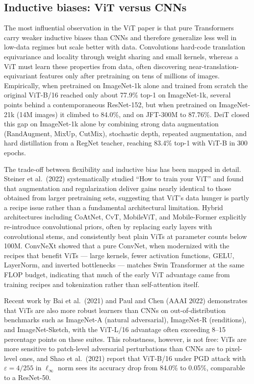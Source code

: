 \documentclass{article}
\begin{document}
\subsection{Inductive biases: ViT versus CNNs}\label{inductive-biases-vit-versus-cnns}

The most influential observation in the ViT paper is that pure Transformers carry weaker inductive biases than CNNs and therefore generalize less well in low-data regimes but scale better with data. Convolutions hard-code translation equivariance and locality through weight sharing and small kernels, whereas a ViT must learn these properties from data, often discovering near-translation-equivariant features only after pretraining on tens of millions of images. Empirically, when pretrained on ImageNet-1k alone and trained from scratch the original ViT-B/16 reached only about 77.9\% top-1 on ImageNet-1k, several points behind a contemporaneous ResNet-152, but when pretrained on ImageNet-21k (14M images) it climbed to 84.0\%, and on JFT-300M to 87.76\%. DeiT \citep{touvron2022resmlpfeedforwardn} closed this gap on ImageNet-1k alone by combining strong data augmentation (RandAugment, MixUp, CutMix), stochastic depth, repeated augmentation, and hard distillation from a RegNet teacher, reaching 83.4\% top-1 with ViT-B in 300 epochs.

The trade-off between flexibility and inductive bias has been mapped in detail. Steiner et al.~(2022) systematically studied ``How to train your ViT'' and found that augmentation and regularization deliver gains nearly identical to those obtained from larger pretraining sets, suggesting that ViT's data hunger is partly a recipe issue rather than a fundamental architectural limitation. Hybrid architectures including CoAtNet, CvT, MobileViT, and Mobile-Former \citep{chen2022mobileformerbridgi} explicitly re-introduce convolutional priors, often by replacing early layers with convolutional stems, and consistently beat plain ViTs at parameter counts below 100M. ConvNeXt \citep{liu2022aconvnetforthe2020} showed that a pure ConvNet, when modernized with the recipes that benefit ViTs --- large kernels, fewer activation functions, GELU, LayerNorm, and inverted bottlenecks --- matches Swin Transformer at the same FLOP budget, indicating that much of the early ViT advantage came from training recipes and tokenization rather than self-attention itself.

Recent work by Bai et al.~(2021) and Paul and Chen (AAAI 2022) demonstrates that ViTs are also more robust learners than CNNs on out-of-distribution benchmarks such as ImageNet-A (natural adversarial), ImageNet-R (renditions), and ImageNet-Sketch, with the ViT-L/16 advantage often exceeding 8--15 percentage points on these suites. This robustness, however, is not free: ViTs are more sensitive to patch-level adversarial perturbations than CNNs are to pixel-level ones, and Shao et al.~(2021) report that ViT-B/16 under PGD attack with \(\varepsilon = 4/255\) in \(\ell_\infty\) norm sees its accuracy drop from 84.0\% to 0.05\%, comparable to a ResNet-50.
\end{document}
